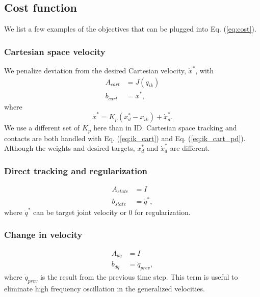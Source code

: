 \documentclass{ws-ijhr}
\newcommand{\eref}[1] {Eq. (\ref{#1})}
\begin{document}
\subsection{Cost function}
We list a few examples of the objectives that can be plugged into 
\eref{eq:cost}. 
\subsubsection{Cartesian space velocity} 
We penalize deviation from the desired Cartesian velocity, $\dot{x}^*$, with 
\begin{equation}
  \begin{split}
    A_{cart} &= J(q_{ik}) \\
    b_{cart} &= \dot{x}^*,
  \label{eq:ik_cart}
  \end{split}
\end{equation}
where 
\begin{equation}
  \dot{x}^* = K_p(x^*_d - x_{ik}) + \dot{x}^*_d.
  \label{eq:ik_cart_pd}
\end{equation}
We use a different set of $K_p$ here than in ID. 
Cartesian space tracking and contacts are both handled with 
\eref{eq:ik_cart} and \eref{eq:ik_cart_pd}. Although the weights and desired 
targets, $x^*_d$ and $\dot{x}^*_d$ are different.

\subsubsection{Direct tracking and regularization} 
\begin{equation}
  \begin{split}
    A_{state} &= I \\
    b_{state} &= \dot{q}^*,
  \end{split}
	\label{eq:ik_reg}
\end{equation} 
where $\dot{q}^*$ can be target joint velocity or 0 for regularization.

\subsubsection{Change in velocity} 
\begin{equation*}
  \begin{split}
    A_{d\dot{q}} &= I \\
    b_{d\dot{q}} &= \dot{q}_{prev},
  \end{split}
\end{equation*} 
where $\dot{q}_{prev}$ is the result from the previous time step. This 
term is useful to eliminate high frequency oscillation in the generalized 
velocities. 
\end{document}
